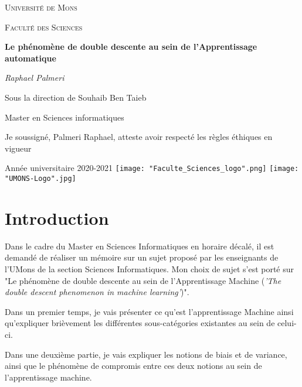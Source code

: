 \documentclass[a4paper]{article}
\author{Raphael Palmeri\\1 ère Master en Sciences Informatiques\\ 2020-2021}
\begin{document}
\begin{titlepage}
	\centering
	{\scshape\LARGE Université de Mons \par}
	\vspace{1cm}
	{\scshape\large Faculté des Sciences \par}
	\vspace{1.5cm}
	{\huge\bfseries Le phénomène de double descente au sein de l'Apprentissage automatique \par}
	\vspace{2cm}
	{\Large\itshape Raphael Palmeri \par}
	\vspace{2.0cm}
	{Sous la direction de Souhaib Ben Taieb \par}
	\vspace{1.0cm}
	{Master en Sciences informatiques \par}
	\vspace{0.5cm}
	{Je soussigné, Palmeri Raphael, atteste avoir respecté les règles éthiques en vigueur \par}
	\vspace{4cm}
	Année universitaire 2020-2021
	\vfill
	\texttt{[image: "Faculte\_Sciences\_logo".png]}
	\hfill
	\texttt{[image: "UMONS-Logo".jpg]}
\end{titlepage}
\newpage
\thispagestyle{empty}
\mbox{}
\newpage

\tableofcontents
\newpage

\section{Introduction}
Dans le cadre du Master en Sciences Informatiques en horaire décalé, il est demandé de réaliser un mémoire sur un sujet proposé par les enseignants de l'UMons de la section Sciences Informatiques. Mon choix de sujet s'est porté sur "Le phénomène de double descente au sein de l'Apprentissage Machine (\textit{'The double descent phenomenon in machine learning'})".\newline

Dans un premier temps, je vais présenter ce qu'est l'apprentissage Machine ainsi qu'expliquer brièvement les différentes sous-catégories existantes au sein de celui-ci. \newline

Dans une deuxième partie, je vais expliquer les notions de biais et de variance, ainsi que le phénomène de compromis entre ces deux notions au sein de l'apprentissage machine. \newline
\end{document}
